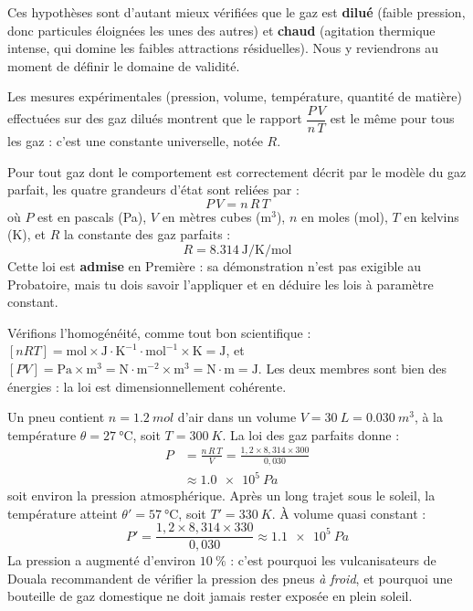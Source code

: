 \documentclass[11pt]{article}
\newcommand{\cle}[1]{{\popxbold\color{popdark}#1}}
\newcounter{popsec}
\newcounter{popsub}
\newcommand{\courssub}[1]{%
  \stepcounter{popsub}%
  \par\vspace{9pt}\noindent{\popxbold\fontsize{11.5}{13}\selectfont\color{popink}{\color{poporange}\thepopsec.\thepopsub}\hspace{6pt}#1}\par\nopagebreak\vspace{4pt}
}
\begin{document}
Ces hypothèses sont d'autant mieux vérifiées que le gaz est \textbf{dilué} (faible pression, donc particules éloignées les unes des autres) et \textbf{chaud} (agitation thermique intense, qui domine les faibles attractions résiduelles). Nous y reviendrons au moment de définir le domaine de validité.

\courssub{Énoncé de la loi des gaz parfaits}

Les mesures expérimentales (pression, volume, température, quantité de matière) effectuées sur des gaz dilués montrent que le rapport $\dfrac{P\,V}{n\,T}$ est le même pour tous les gaz : c'est une constante universelle, notée $R$.

\begin{propriete}
Pour tout gaz dont le comportement est correctement décrit par le modèle du gaz parfait, les quatre grandeurs d'état sont reliées par :
\[ \boxed{\ P\,V = n\,R\,T\ } \]
où $P$ est en pascals (Pa), $V$ en mètres cubes ($\text{m}^3$), $n$ en moles (mol), $T$ en kelvins (K), et $R$ la \cle{constante des gaz parfaits} :
\[ R = \SI{8,314}{\joule\per\kelvin\per\mole} \]
Cette loi est \textbf{admise} en Première : sa démonstration n'est pas exigible au Probatoire, mais tu dois savoir l'appliquer et en déduire les lois à paramètre constant.
\end{propriete}

Vérifions l'homogénéité, comme tout bon scientifique : $[nRT] = \text{mol}\times\text{J}\cdot\text{K}^{-1}\cdot\text{mol}^{-1}\times\text{K} = \text{J}$, et $[PV] = \text{Pa}\times\text{m}^3 = \text{N}\cdot\text{m}^{-2}\times\text{m}^3 = \text{N}\cdot\text{m} = \text{J}$. Les deux membres sont bien des énergies : la loi est dimensionnellement cohérente.

\begin{exemplebox}
Un pneu contient $n = \SI{1,2}{mol}$ d'air dans un volume $V = \SI{30}{L} = \SI{0,030}{m^3}$, à la température $\theta = \SI{27}{\celsius}$, soit $T = \SI{300}{K}$. La loi des gaz parfaits donne :
\begin{align*}
P &= \frac{n\,R\,T}{V} = \frac{1,2 \times 8,314 \times 300}{0,030} \\
  &\approx \SI{1,0e5}{Pa}
\end{align*}
soit environ la pression atmosphérique. Après un long trajet sous le soleil, la température atteint $\theta' = \SI{57}{\celsius}$, soit $T' = \SI{330}{K}$. À volume quasi constant :
\[ P' = \frac{1,2 \times 8,314 \times 330}{0,030} \approx \SI{1,1e5}{Pa} \]
La pression a augmenté d'environ $10\ \%$ : c'est pourquoi les vulcanisateurs de Douala recommandent de vérifier la pression des pneus \emph{à froid}, et pourquoi une bouteille de gaz domestique ne doit jamais rester exposée en plein soleil.
\end{exemplebox}
\end{document}
